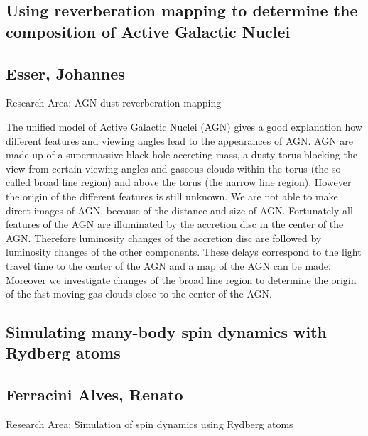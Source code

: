 \newpage
\subsection*{\centering \large Using reverberation mapping to determine the composition of Active Galactic Nuclei}
\subsection*{\centering \normalsize Esser, Johannes}
Research Area: AGN dust reverberation mapping\newline

\noindent The unified model of Active Galactic Nuclei (AGN) gives a good explanation how different features and viewing angles lead to the appearances of AGN. AGN are made up of a supermassive black hole accreting mass, a dusty torus blocking the view from certain viewing angles and gaseous clouds within the torus (the so called broad line region) and above the torus (the narrow line region). However the origin of the different features is still unknown. We are not able to make direct images of AGN, because of the distance and size of AGN. Fortunately all features of the AGN are illuminated by the accretion disc in the center of the AGN. Therefore luminosity changes of the accretion disc are followed by luminosity changes of the other components. These delays correspond to the light travel time to the center of the AGN and a map of the AGN can be made. Moreover we investigate changes of the broad line region to determine the origin of the fast moving gas clouds close to the center of the AGN.

\subsection*{\centering \large Simulating many-body spin dynamics with Rydberg atoms}
\subsection*{\centering \normalsize Ferracini Alves, Renato}
Research Area: Simulation of spin dynamics using Rydberg atoms\newline

